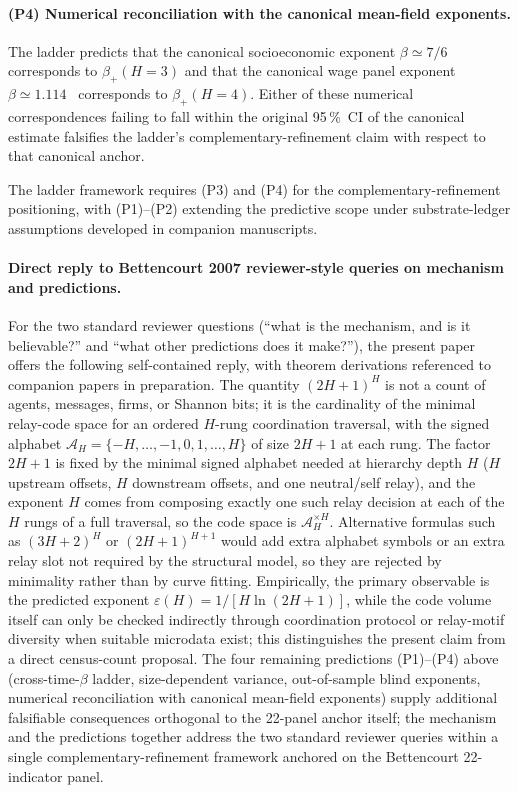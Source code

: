 \paragraph{(P4) Numerical reconciliation with the canonical mean-field exponents.}
The ladder predicts that the canonical socioeconomic exponent
$\beta\simeq 7/6$~\cite{Bettencourt2013} corresponds to
$\beta_+(H{=}3)$ and that the canonical wage panel exponent
$\beta\simeq 1.114$~\cite{Bettencourt2020SciAdv} corresponds to
$\beta_+(H{=}4)$. Either of these numerical correspondences failing to
fall within the original 95\,\%~CI of the canonical estimate
falsifies the ladder's complementary-refinement claim with respect to
that canonical anchor.

The ladder framework requires (P3) and (P4) for the
complementary-refinement positioning, with (P1)--(P2) extending the
predictive scope under substrate-ledger assumptions developed in
companion manuscripts.

\paragraph{Direct reply to Bettencourt 2007 reviewer-style queries on mechanism and predictions.}
For the two standard reviewer questions (``what is the mechanism, and is it believable?'' and ``what other predictions does it make?''), the present paper offers the following self-contained reply, with theorem derivations referenced to companion papers in preparation. The quantity $(2H+1)^H$ is not a count of agents, messages, firms, or Shannon bits; it is the cardinality of the minimal relay-code space for an ordered $H$-rung coordination traversal, with the signed alphabet $\mathcal{A}_H=\{-H,\dots,-1,0,1,\dots,H\}$ of size $2H+1$ at each rung. The factor $2H+1$ is fixed by the minimal signed alphabet needed at hierarchy depth $H$ ($H$ upstream offsets, $H$ downstream offsets, and one neutral/self relay), and the exponent $H$ comes from composing exactly one such relay decision at each of the $H$ rungs of a full traversal, so the code space is $\mathcal{A}_H^{\times H}$. Alternative formulas such as $(3H+2)^H$ or $(2H+1)^{H+1}$ would add extra alphabet symbols or an extra relay slot not required by the structural model, so they are rejected by minimality rather than by curve fitting. Empirically, the primary observable is the predicted exponent $\varepsilon(H)=1/[H\ln(2H+1)]$, while the code volume itself can only be checked indirectly through coordination protocol or relay-motif diversity when suitable microdata exist; this distinguishes the present claim from a direct census-count proposal. The four remaining predictions (P1)--(P4) above (cross-time-$\beta$ ladder, size-dependent variance, out-of-sample blind exponents, numerical reconciliation with canonical mean-field exponents) supply additional falsifiable consequences orthogonal to the 22-panel anchor itself; the mechanism and the predictions together address the two standard reviewer queries within a single complementary-refinement framework anchored on the Bettencourt 22-indicator panel.


